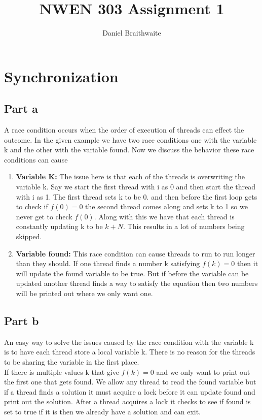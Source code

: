 \documentclass[a4paper, 12pt]{article}
\title{NWEN 303 Assignment 1}
\author{Daniel Braithwaite}
\begin{document}
	\maketitle
	\newpage
  	
	\section{Synchronization}
		\subsection{Part a}
			A race condition occurs when the order of execution of threads can effect the outcome. In the given example we have two race conditions one with the variable k and the other with the variable found. Now we discuss the behavior these race conditions can cause
			
			\begin{enumerate}
				\item \textbf{Variable K:} The issue here is that each of the threads is overwriting the variable k. Say we start the first thread with i as 0 and then start the thread with i as 1. The first thread sets k to be 0. and then before the first loop gets to check if $f(0) = 0$ the second thread comes along and sets k to 1 so we never get to check $f(0)$. Along with this we have that each thread is constantly updating k to be $k + N$. This results in a lot of numbers being skipped.
				
				\item \textbf{Variable found:} This race condition can cause threads to run to run longer than they should. If one thread finds a number k satisfying $f(k) = 0$ then it will update the found variable to be true. But if before the variable can be updated another thread finds a way to satisfy the equation then two numbers will be printed out where we only want one.
			\end{enumerate}
			
			
		\subsection{Part b}
			An easy way to solve the issues caused by the race condition with the variable k is to have each thread store a local variable k. There is no reason for the threads to be sharing the variable in the first place.\\
			
			If there is multiple values k that give $f(k) = 0$ and we only want to print out the first one that gets found. We allow any thread to read the found variable but if a thread finds a solution it must acquire a lock before it can update found and print out the solution. After a thread acquires a lock it checks to see if found is set to true if it is then we already have a solution and can exit. 
			
\end{document}
